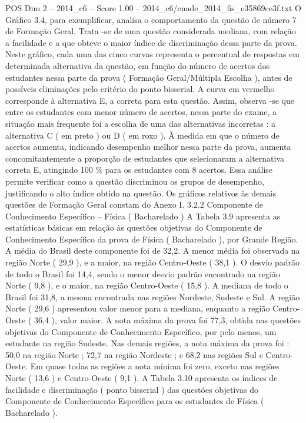 \begin{textsample}{POS Dim 2 – 2014\_c6 – Score 1.00 – 2014\_c6/enade\_2014\_fis\_e35869ce3f.txt}
O Gráfico 3.4, para exemplificar, analisa o comportamento da questão de número 7 de Formação Geral.
Trata -se de uma questão considerada mediana, com relação a facilidade e a que obteve o maior índice de discriminação dessa parte da prova.
Neste gráfico, cada uma das cinco curvas representa o percentual de respostas em determinada alternativa da questão, em função do número de acertos dos estudantes nessa parte da prova ( Formação Geral/Múltipla Escolha ), antes de possíveis eliminações pelo critério do ponto bisserial.
A curva em vermelho corresponde à alternativa E, a correta para esta questão.
Assim, observa -se que entre os estudantes com menor número de acertos, nessa parte do exame, a situação mais frequente foi a escolha de uma das alternativas incorretas : a alternativa C ( em preto ) ou D ( em roxo ).
À medida em que o número de acertos aumenta, indicando desempenho melhor nessa parte da prova, aumenta concomitantemente a proporção de estudantes que selecionaram a alternativa correta E, atingindo 100 \% para os estudantes com 8 acertos.
Essa análise permite verificar como a questão discriminou os grupos de desempenho, justificando o alto índice obtido na questão.
Os gráficos relativos às demais questões de Formação Geral constam do Anexo I. 3.2.2 Componente de Conhecimento Específico – Física ( Bacharelado ) A Tabela 3.9 apresenta as estatísticas básicas em relação às questões objetivas do Componente de Conhecimento Específico da prova de Física ( Bacharelado ), por Grande Região.
A média do Brasil deste componente foi de 32,2.
A menor média foi observada na região Norte ( 29,9 ), e a maior, na região Centro-Oeste ( 38,1 ).
O desvio padrão de todo o Brasil foi 14,4, sendo o menor desvio padrão encontrado na região Norte ( 9,8 ), e o maior, na região Centro-Oeste ( 15,8 ).
A mediana de todo o Brasil foi 31,8, a mesma encontrada nas regiões Nordeste, Sudeste e Sul.
A região Norte ( 29,6 ) apresentou valor menor para a mediana, enquanto a região Centro-Oeste ( 36,4 ), valor maior.
A nota máxima da prova foi 77,3, obtida nas questões objetivas do Componente de Conhecimento Específico, por pelo menos, um estudante na região Sudeste.
Nas demais regiões, a nota máxima da prova foi : 50,0 na região Norte ; 72,7 na região Nordeste ; e 68,2 nas regiões Sul e Centro-Oeste.
Em quase todas as regiões a nota mínima foi zero, exceto nas regiões Norte ( 13,6 ) e Centro-Oeste ( 9,1 ).
A Tabela 3.10 apresenta os índices de facilidade e discriminação ( ponto bisserial ) das questões objetivas do Componente de Conhecimento Específico para os estudantes de Física ( Bacharelado ).

\end{textsample}
